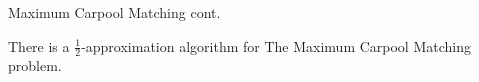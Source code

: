 \begin{frame}{Maximum Carpool Matching cont.}
\begin{theorem}
There is a $\frac{1}{2}$-approximation algorithm for The Maximum Carpool Matching problem.
\end{theorem}
\end{frame}